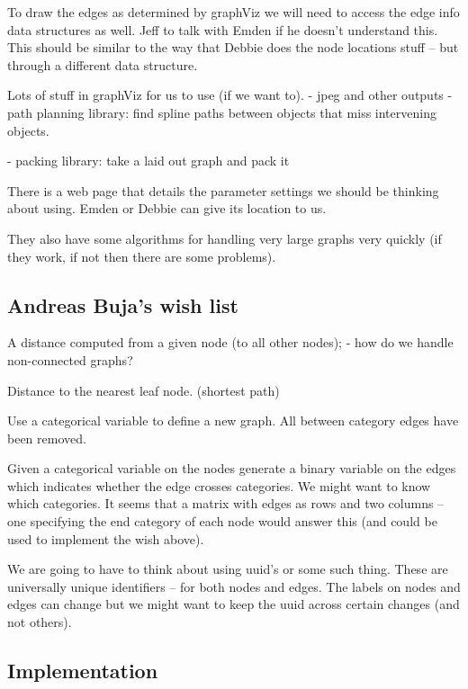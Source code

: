 To draw the edges as determined by graphViz we will need to access the
edge info data structures as well. Jeff to talk with Emden if he
doesn't understand this. This should be similar to the way that Debbie
does the node locations stuff -- but through a different data
structure.

Lots of stuff in graphViz for us to use (if we want to).
 - jpeg and other outputs
 - path planning library: find spline paths between objects that miss
     intervening objects.

 - packing library: take a laid out graph and pack it

There is a web page that details the parameter settings we should be
thinking about using. Emden or Debbie can give its location to us.

They also have some algorithms for handling very large graphs very
quickly (if they work, if not then there are some problems).

\subsection{Andreas Buja's wish list}

A distance computed from a given node (to all other nodes);
  - how do we handle non-connected graphs?

Distance to the nearest leaf node.
(shortest path)

Use a categorical variable to define a new graph. All between category
edges have been removed.

Given a categorical variable on the nodes generate a binary variable
on the edges which indicates whether the edge crosses categories.
We might want to know which categories. It seems that a matrix with 
edges as rows and two columns -- one specifying the end category of
each node would answer this (and could be used to implement the wish
above).

We are going to have to think about using uuid's or some such thing. 
These are universally unique identifiers -- for both nodes and edges. 
The labels on nodes and edges can change but we might want to keep the
uuid across certain changes (and not others).

\subsection{Implementation}

